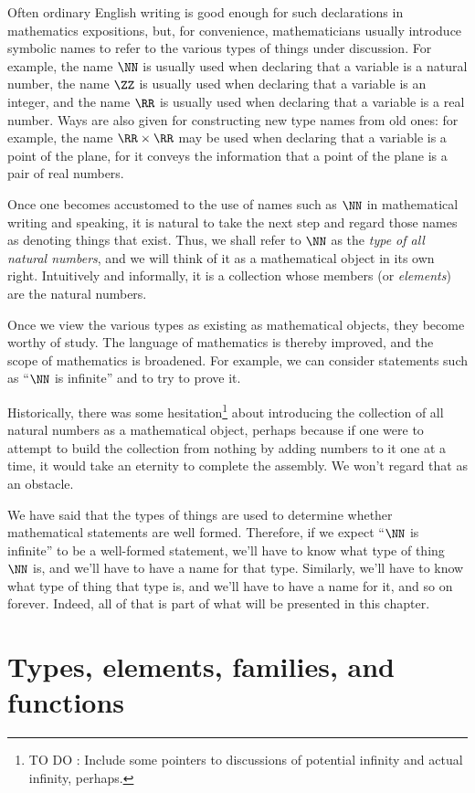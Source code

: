 Often ordinary English writing is good enough for such declarations in mathematics expositions, but, for convenience, mathematicians usually
introduce symbolic names to refer to the various types of things under discussion.  For example, the name $\NN$ is usually used when declaring
that a variable is a natural number, the name $\ZZ$ is usually used when declaring that a variable is an integer, and the name $\RR$ is usually
used when declaring that a variable is a real number.  Ways are also given for constructing new type names from old ones: for example, the name
$\RR\times\RR$ may be used when declaring that a variable is a point of the plane, for it conveys the information that a point of the plane is a
pair of real numbers.

Once one becomes accustomed to the use of names such as $\NN$ in mathematical writing and speaking, it is natural to take the next step and
regard those names as denoting things that exist.  Thus, we shall refer to $\NN$ as the \emph{type of all natural numbers}, and we will think of
it as a mathematical object in its own right.  Intuitively and informally, it is a collection whose members (or \emph{elements}) are the natural
numbers.

Once we view the various types as existing as mathematical objects, they become worthy of study.  The language of mathematics is thereby
improved, and the scope of mathematics is broadened.  For example, we can consider statements such as ``$\NN$ is infinite'' and to try to prove
it.

Historically, there was some hesitation\footnote{TO DO : Include some pointers to discussions of potential infinity and actual infinity, perhaps.} about
introducing the collection of all natural numbers as a mathematical object, perhaps because if one were to attempt to build the collection from
nothing by adding numbers to it one at a time, it would take an eternity to complete the assembly.  We won't regard that as an obstacle.

We have said that the types of things are used to determine whether mathematical statements are well formed.
Therefore, if we expect ``$\NN$ is infinite'' to be a well-formed statement, we'll have to know what type of thing $\NN$ is, and we'll
have to have a name for that type.  Similarly, we'll have to know what type of thing that type is, and we'll have to have a name for it,
and so on forever.  Indeed, all of that is part of what will be presented in this chapter.

\section{Types, elements, families, and functions}
\label{univalent-mathematics}

